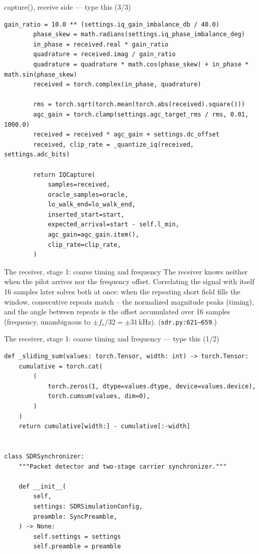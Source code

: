 \documentclass[10pt]{beamer}
\begin{document}
\begin{frame}[fragile]{capture(), receive side --- type this (3/3)}
\begin{lstlisting}[basicstyle=\ttfamily\tiny]
        gain_ratio = 10.0 ** (settings.iq_gain_imbalance_db / 40.0)
        phase_skew = math.radians(settings.iq_phase_imbalance_deg)
        in_phase = received.real * gain_ratio
        quadrature = received.imag / gain_ratio
        quadrature = quadrature * math.cos(phase_skew) + in_phase * math.sin(phase_skew)
        received = torch.complex(in_phase, quadrature)

        rms = torch.sqrt(torch.mean(torch.abs(received).square()))
        agc_gain = torch.clamp(settings.agc_target_rms / rms, 0.01, 1000.0)
        received = received * agc_gain + settings.dc_offset
        received, clip_rate = _quantize_iq(received, settings.adc_bits)

        return IQCapture(
            samples=received,
            oracle_samples=oracle,
            lo_walk_end=lo_walk_end,
            inserted_start=start,
            expected_arrival=start - self.l_min,
            agc_gain=agc_gain.item(),
            clip_rate=clip_rate,
        )
\end{lstlisting}
\end{frame}

\begin{frame}{The receiver, stage 1: coarse timing and frequency}
  The receiver knows neither when the pilot arrives nor the
  frequency offset. Correlating the signal with itself 16
  samples later solves both at once: when the repeating short
  field fills the window, consecutive repeats match -- the
  normalized magnitude peaks (timing), and the angle between
  repeats is the offset accumulated over 16 samples
  (frequency, unambiguous to $\pm f_s/32 = \pm31$\,kHz).
  (\texttt{sdr.py:621--659}.)
\end{frame}

\begin{frame}[fragile]{The receiver, stage 1: coarse timing and frequency --- type this (1/2)}
\begin{lstlisting}[basicstyle=\ttfamily\tiny]
def _sliding_sum(values: torch.Tensor, width: int) -> torch.Tensor:
    cumulative = torch.cat(
        (
            torch.zeros(1, dtype=values.dtype, device=values.device),
            torch.cumsum(values, dim=0),
        )
    )
    return cumulative[width:] - cumulative[:-width]


class SDRSynchronizer:
    """Packet detector and two-stage carrier synchronizer."""

    def __init__(
        self,
        settings: SDRSimulationConfig,
        preamble: SyncPreamble,
    ) -> None:
        self.settings = settings
        self.preamble = preamble
\end{lstlisting}
\end{frame}
\end{document}
